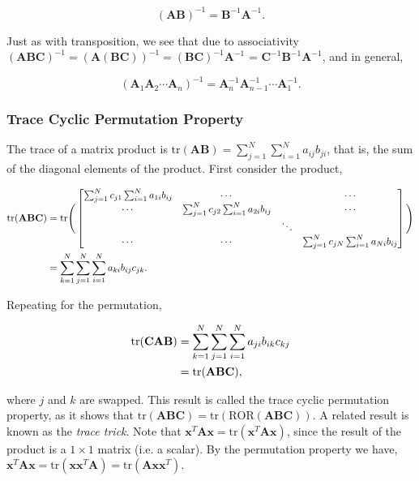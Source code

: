 \documentclass[11pt]{amsart}
\begin{document}
$$(\mathbf{AB})^{-1} = \mathbf{B}^{-1}\mathbf{A}^{-1}.$$

Just as with transposition, we see that due to associativity $(\mathbf{ABC})^{-1} = (\mathbf{A(BC)})^{-1} = (\mathbf{BC})^{-1}\mathbf{A}^{-1}$ = $\mathbf{C}^{-1}\mathbf{B}^{-1}\mathbf{A}^{-1}$, and in general,

$$(\mathbf{A}_1\mathbf{A}_2\cdots \mathbf{A}_n)^{-1} = \mathbf{A}_n^{-1}\mathbf{A}_{n-1}^{-1}\cdots\mathbf{A}_1^{-1}.$$

\subsubsection{Trace Cyclic Permutation Property}

The trace of a matrix product is $\text{tr}(\mathbf{A}\mathbf{B}) = \sum_{j=1}^N\sum_{i = 1}^N a_{ij}b_{ji}$, that is, the sum of the diagonal elements of the product. First consider the product,

\begin{align}
\text{tr}(\mathbf{A}\mathbf{B}\mathbf{C}) &= \text{tr}\Bigg(\begin{bmatrix}
\sum_{j=1}^N c_{j1}\sum_{i=1}^Na_{1i}b_{ij} & \cdots & & \cdots \\
\cdots & \sum_{j=1}^N c_{j2}\sum_{i=1}^Na_{2i}b_{ij} & & \cdots \\
 &  & \ddots & \\
\cdots & \cdots &&  \sum_{j=1}^N c_{jN}\sum_{i=1}^Na_{Ni}b_{ij} \\
\end{bmatrix}\Bigg) \notag \\
&= \sum_{k=1}^N\sum_{j=1}^N\sum_{i=1}^Na_{ki}b_{ij}c_{jk}. \notag
\end{align}

Repeating for the permutation,

\begin{align}
\text{tr}(\mathbf{C}\mathbf{A}\mathbf{B}) &= \sum_{k=1}^N\sum_{j=1}^N\sum_{i=1}^Na_{ji}b_{ik}c_{kj} \notag \\
&= \text{tr}(\mathbf{A}\mathbf{B}\mathbf{C}), \notag
\end{align}

where $j$ and $k$ are swapped. This result is called the trace cyclic permutation property, as it shows that $\text{tr}(\mathbf{A}\mathbf{B}\mathbf{C}) = \text{tr}(\text{ROR}(\mathbf{A}\mathbf{B}\mathbf{C}))$. A related result is known as the \emph{trace trick}. Note that $\mathbf{x}^T\mathbf{A}\mathbf{x} = \text{tr}(\mathbf{x}^T\mathbf{A}\mathbf{x})$, since the result of the product is a $1 \times 1$ matrix (i.e. a scalar). By the permutation property we have, $\mathbf{x}^T\mathbf{A}\mathbf{x} = \text{tr}(\mathbf{x}\mathbf{x}^T\mathbf{A}) = \text{tr}(\mathbf{A}\mathbf{x}\mathbf{x}^T)$.
\end{document}
